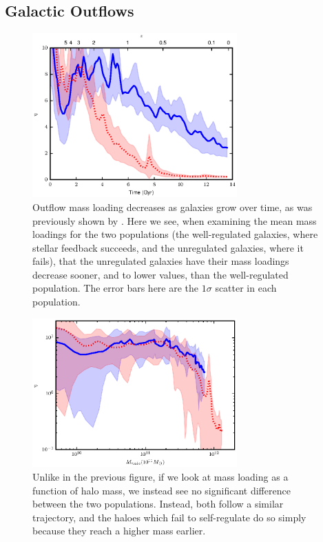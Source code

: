\subsection{Galactic Outflows}
\begin{figure}
    \includegraphics[width=0.7\textwidth]{figures3/massloading_time.eps}
    \caption[Outflow mass loading evolution in MUGS2]{Outflow mass loading
    decreases as galaxies grow over time, as was previously shown by
    \citet{Keller2015}.  Here we see, when examining the mean mass loadings for
    the two populations (the well-regulated galaxies, where stellar feedback
    succeeds, and the unregulated galaxies, where it fails), that the
    unregulated galaxies have their mass loadings decrease sooner, and to lower
    values, than the well-regulated population.  The error bars here are the
    $1\sigma$ scatter in each population.}
    \label{massloading_time}
\end{figure}
\begin{figure}
    \includegraphics[width=0.7\textwidth]{figures3/massloading_halo.eps}
    \caption[Mass loading as a function of halo mass in MUGS2]{Unlike in the
    previous figure, if we look at mass loading as a function of halo mass, we
    instead see no significant difference between the two populations.  Instead,
    both follow a similar trajectory, and the haloes which fail to self-regulate
    do so simply because they reach a higher mass earlier.}
    \label{massloading_halo}
\end{figure}

